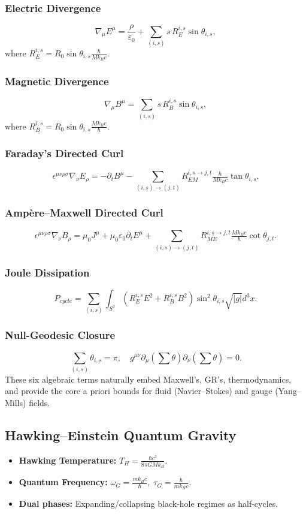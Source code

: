 ﻿\documentclass[12pt]{article}
\begin{document}
\subsubsection{Electric Divergence}
$$
\nabla_\mu E^\mu = \frac{\rho}{\varepsilon_0} + \sum_{(i,s)} s\,R_E^{i,s}\sin\theta_{i,s},
$$
where $R_E^{i,s}=R_0\sin\theta_{i,s}\tfrac{\hbar}{Mk_Bc}$.

\subsubsection{Magnetic Divergence}
$$
\nabla_\mu B^\mu = \sum_{(i,s)} s\,R_B^{i,s}\sin\theta_{i,s},
$$
where $R_B^{i,s}=R_0\sin\theta_{i,s}\tfrac{Mk_Bc}{\hbar}$.

\subsubsection{Faraday’s Directed Curl}
$$
\epsilon^{\mu\nu\rho\sigma}\nabla_\nu E_\rho = -\partial_t B^\mu - \sum_{(i,s)\to(j,t)}R_{EM}^{i,s\to j,t}\tfrac{\hbar}{Mk_Bc}\tan\theta_{i,s}.
$$

\subsubsection{Ampère–Maxwell Directed Curl}
$$
\epsilon^{\mu\nu\rho\sigma}\nabla_\nu B_\rho = \mu_0J^\mu + \mu_0\varepsilon_0\partial_tE^\mu + \sum_{(i,s)\to(j,t)}R_{ME}^{i,s\to j,t}\tfrac{Mk_Bc}{\hbar}\cot\theta_{j,t}.
$$

\subsubsection{Joule Dissipation}
$$
P_{cycle}=\sum_{(i,s)}\int_{S^3}(R_E^{i,s}E^2+R_B^{i,s}B^2)\sin^2\theta_{i,s}\sqrt{|g|}d^3x.
$$

\subsubsection{Null-Geodesic Closure}
$$
\sum_{(i,s)}\theta_{i,s}=\pi,
\quad g^{\mu\nu}\partial_\mu\left(\sum\theta\right)\partial_\nu\left(\sum\theta\right)=0.
$$
These six algebraic terms naturally embed Maxwell’s, GR’s, thermodynamics, and provide the core a priori bounds for fluid (Navier–Stokes) and gauge (Yang–Mills) fields.

\subsection{Hawking–Einstein Quantum Gravity}
\begin{itemize}
   \item \textbf{Hawking Temperature:} $T_H=\tfrac{\hbar c^3}{8\pi GMk_B}$.
   \item \textbf{Quantum Frequency:} $\omega_G=\tfrac{m k_B c}{\hbar},\;\tau_G=\tfrac{\hbar}{m k_B c}$.
   \item \textbf{Dual phases:} Expanding/collapsing black-hole regimes as half-cycles.
\end{itemize}
\end{document}
